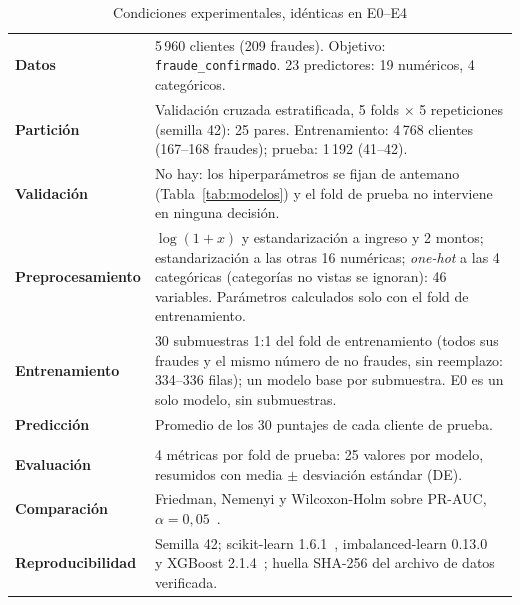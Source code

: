 \documentclass[conference,a4paper]{IEEEtran}
\begin{document}
\begin{table}[t]
\caption{Condiciones experimentales, idénticas en E0--E4}
\label{tab:condiciones}
\centering
\footnotesize
\renewcommand{\arraystretch}{1.1}
\begin{tabularx}{\columnwidth}{@{}>{\bfseries}p{1.55cm} L@{}}
\toprule
Datos & 5\,960 clientes (209 fraudes). Objetivo: \texttt{fraude\_confirmado}. 23 predictores: 19 numéricos, 4 categóricos. \\
Partición & Validación cruzada estratificada, 5 folds $\times$ 5 repeticiones (semilla 42): 25 pares. Entrenamiento: 4\,768 clientes (167--168 fraudes); prueba: 1\,192 (41--42). \\
Validación & No hay: los hiperparámetros se fijan de antemano (Tabla~\ref{tab:modelos}) y el fold de prueba no interviene en ninguna decisión. \\
Preproce\-samiento & $\log(1+x)$ y estandarización a ingreso y 2 montos; estandarización a las otras 16 numéricas; \emph{one-hot} a las 4 categóricas (categorías no vistas se ignoran): 46 variables. Parámetros calculados solo con el fold de entrenamiento. \\
Entrena\-miento & 30 submuestras 1:1 del fold de entrenamiento (todos sus fraudes y el mismo número de no fraudes, sin reemplazo: 334--336 filas); un modelo base por submuestra. E0 es un solo modelo, sin submuestras. \\
Predicción & Promedio de los 30 puntajes de cada cliente de prueba. \\\\
Evaluación & 4 métricas por fold de prueba: 25 valores por modelo, resumidos con media $\pm$ desviación estándar (DE). \\
Compara\-ción & Friedman, Nemenyi y Wilcoxon-Holm sobre PR-AUC, $\alpha = 0{,}05$~\cite{demsar2006}. \\
Reprodu\-cibilidad & Semilla 42; scikit-learn 1.6.1~\cite{pedregosa2011}, imbalanced-learn 0.13.0~\cite{lemaitre2017} y XGBoost 2.1.4~\cite{chen2016}; huella SHA-256 del archivo de datos verificada. \\
\bottomrule
\end{tabularx}
\end{table}
\end{document}
